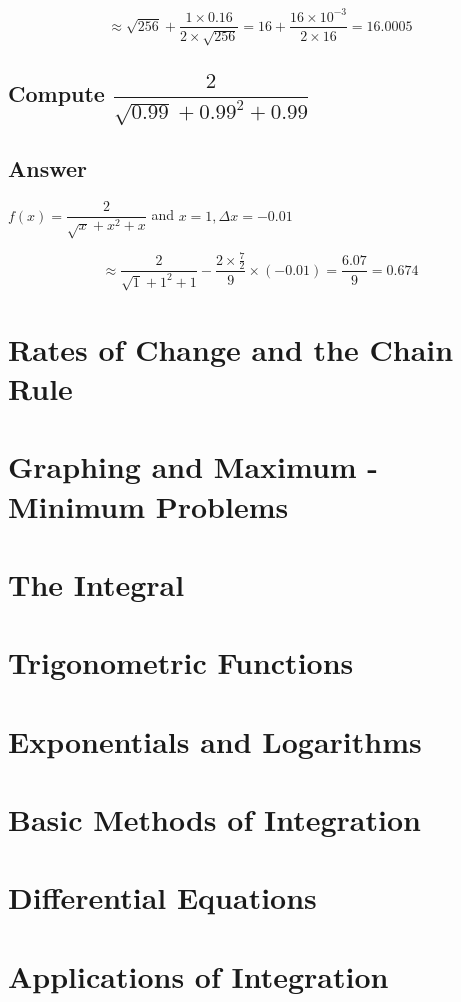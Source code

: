 \documentclass[11pt]{article}
\begin{document}
\[
\approx \sqrt{256} + \dfrac{1 \times 0.16}{2 \times \sqrt{256}} = 16 + \dfrac{16 \times 10^{-3}}{2 \times 16} = 16.0005
\]

\vspace{2em}

\subsection{Compute $\dfrac{2}{\sqrt{0.99} + 0.99^2 + 0.99}$}
\subsection*{Answer}

$f(x) = \dfrac{2}{\sqrt{x} + x^2 + x}$ and $x = 1, \Delta x = -0.01$

\[
\approx \dfrac{2}{\sqrt{1} + 1^2 + 1} - \dfrac{2 \times \frac{7}{2}}{9} \times (-0.01) = \dfrac{6.07}{9} = 0.674
\]

\vspace{2em}

\newpage






\section{Rates of Change and the Chain Rule}
\section{Graphing and Maximum - Minimum Problems}
\section{The Integral}
\section{Trigonometric Functions}
\section{Exponentials and Logarithms}
\section{Basic Methods of Integration}
\section{Differential Equations}
\section{Applications of Integration}
\end{document}
